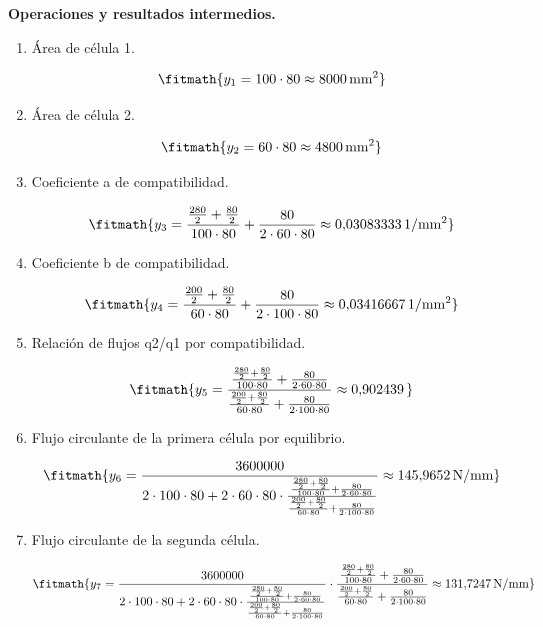 \noindent\textbf{Operaciones y resultados intermedios.}

\begin{enumerate}

\item Área de célula 1.

\[\fitmath{y_{1}=100\cdot 80\approx 8000\,\mathrm{mm^{2}}}\]

\item Área de célula 2.

\[\fitmath{y_{2}=60\cdot 80\approx 4800\,\mathrm{mm^{2}}}\]

\item Coeficiente a de compatibilidad.

\[\fitmath{y_{3}=\frac{\frac{280}{2}+\frac{80}{2}}{100\cdot 80}+\frac{80}{2\cdot 60\cdot 80}\approx 0{,}03083333\,\mathrm{1/mm^{2}}}\]

\item Coeficiente b de compatibilidad.

\[\fitmath{y_{4}=\frac{\frac{200}{2}+\frac{80}{2}}{60\cdot 80}+\frac{80}{2\cdot 100\cdot 80}\approx 0{,}03416667\,\mathrm{1/mm^{2}}}\]

\item Relación de flujos q2/q1 por compatibilidad.

\[\fitmath{y_{5}=\frac{\frac{\frac{280}{2}+\frac{80}{2}}{100\cdot 80}+\frac{80}{2\cdot 60\cdot 80}}{\frac{\frac{200}{2}+\frac{80}{2}}{60\cdot 80}+\frac{80}{2\cdot 100\cdot 80}}\approx 0{,}902439\,}\]

\item Flujo circulante de la primera célula por equilibrio.

\[\fitmath{y_{6}=\frac{3600000}{2\cdot 100\cdot 80+2\cdot 60\cdot 80\cdot \frac{\frac{\frac{280}{2}+\frac{80}{2}}{100\cdot 80}+\frac{80}{2\cdot 60\cdot 80}}{\frac{\frac{200}{2}+\frac{80}{2}}{60\cdot 80}+\frac{80}{2\cdot 100\cdot 80}}}\approx 145{,}9652\,\mathrm{N/mm}}\]

\item Flujo circulante de la segunda célula.

\[\fitmath{y_{7}=\frac{3600000}{2\cdot 100\cdot 80+2\cdot 60\cdot 80\cdot \frac{\frac{\frac{280}{2}+\frac{80}{2}}{100\cdot 80}+\frac{80}{2\cdot 60\cdot 80}}{\frac{\frac{200}{2}+\frac{80}{2}}{60\cdot 80}+\frac{80}{2\cdot 100\cdot 80}}}\cdot \frac{\frac{\frac{280}{2}+\frac{80}{2}}{100\cdot 80}+\frac{80}{2\cdot 60\cdot 80}}{\frac{\frac{200}{2}+\frac{80}{2}}{60\cdot 80}+\frac{80}{2\cdot 100\cdot 80}}\approx 131{,}7247\,\mathrm{N/mm}}\]


\end{enumerate}
